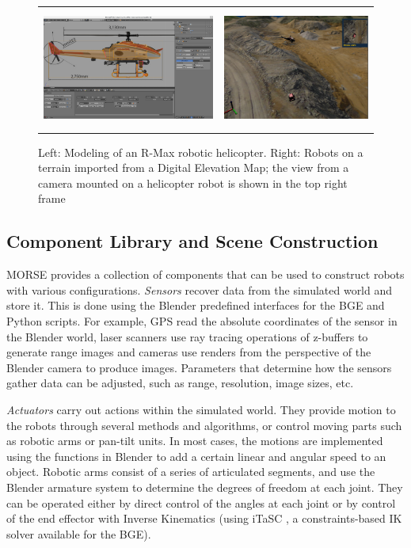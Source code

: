 \documentclass{llncs}
\begin{document}
\begin{figure}[ht!]
\centering
\begin{tabular}{cc}
 \includegraphics[height=1.55in]{pics/MORSE-rmax_mesh.png} &
 \includegraphics[height=1.55in]{pics/MORSE-quarry_ok-1.png}
\end{tabular}
\caption{Left: Modeling of an R-Max robotic helicopter. Right: Robots on a
    terrain imported from a Digital Elevation Map; the view from a camera mounted
    on a helicopter robot is shown in the top right frame}
\label{fig:models}
\end{figure}


\subsection{Component Library and Scene Construction}
\label{section:components}

MORSE provides a collection of components that can be used to construct robots
with various configurations.
\emph{Sensors} recover data from the simulated world and store it. This is
done using the Blender predefined interfaces for the BGE and Python scripts.
For example, GPS read the absolute coordinates of the sensor in the
Blender world, laser scanners use ray tracing operations of z-buffers to
generate range images and cameras use renders from the perspective of the
Blender camera to produce images. Parameters that determine how the sensors
gather data can be adjusted, such as range, resolution, image sizes, etc.

\emph{Actuators} carry out actions within the simulated
world. They provide motion to the robots through several
methods and algorithms, or control moving parts such as robotic arms or
pan-tilt units. In most cases, the motions are implemented using the
functions in Blender to add a certain linear and angular speed to an
object.
Robotic arms consist of a series of articulated segments, and use the
Blender armature system to determine the degrees of freedom at each joint.
They can be operated either by direct control of the angles at each joint
or by control of the end effector with Inverse Kinematics (using iTaSC
\cite{iTaSC}, a constraints-based IK solver available for the BGE).
\end{document}

